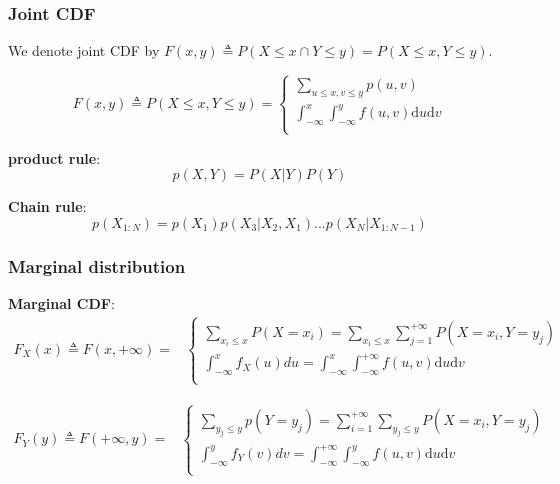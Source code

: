 \subsubsection{Joint CDF}
We denote joint CDF by $F(x,y) \triangleq P(X \leq x \cap Y \leq y)=P(X \leq x , Y \leq y)$.

\begin{equation}
F(x,y) \triangleq P(X \leq x, Y \leq y)=\begin{cases}
\sum_{u \leq x, v \leq y}p(u,v) \\
\int_{-\infty}^{x}\int_{-\infty}^{y} f(u,v)\mathrm{d}u\mathrm{d}v \\
\end{cases}
\end{equation}

\textbf{product rule}:
\begin{equation}\label{eqn:product-rule}
p(X,Y)=P(X|Y)P(Y)
\end{equation}

\textbf{Chain rule}:
\begin{equation}
p(X_{1:N})=p(X_1)p(X_3|X_2,X_1)...p(X_N|X_{1:N-1})
\end{equation}


\subsubsection{Marginal distribution}
\textbf{Marginal CDF}:
\begin{equation}\begin{split}
F_X(x) \triangleq F(x,+\infty)= 
& \begin{cases}
\sum\limits_{x_i \leq x}P(X=x_i)=\sum\limits_{x_i \leq x}\sum\limits_{j=1}^{+\infty}P(X=x_i,Y=y_j) \\
\int_{-\infty}^{x}f_X(u)du=\int_{-\infty}^{x}\int_{-\infty}^{+\infty} f(u,v)\mathrm{d}u\mathrm{d}v \\
\end{cases}
\end{split}\end{equation}

\begin{equation}\begin{split}
F_Y(y) \triangleq F(+\infty,y)= 
& \begin{cases}
\sum\limits_{y_j \leq y}p(Y=y_j)=\sum\limits_{i=1}^{+\infty}\sum_{y_j \leq y}P(X=x_i,Y=y_j) \\
\int_{-\infty}^{y}f_Y(v)dv=\int_{-\infty}^{+\infty}\int_{-\infty}^{y} f(u,v)\mathrm{d}u\mathrm{d}v \\
\end{cases}
\end{split}\end{equation}


